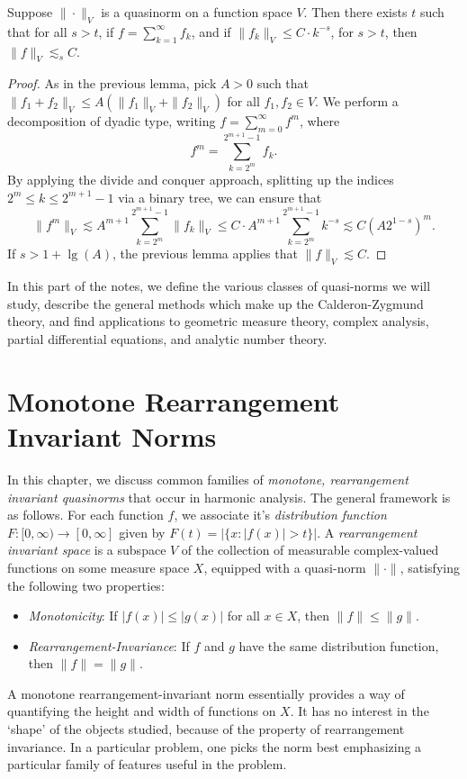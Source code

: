 \begin{lemma}
    Suppose $\| \cdot \|_V$ is a quasinorm on a function space $V$. Then there exists $t$ such that for all $s > t$, if $f = \sum_{k = 1}^\infty f_k$, and if $\| f_k \|_V \leq C \cdot k^{-s}$, for $s > t$, then $\| f \|_V \lesssim_s C$.
\end{lemma}
\begin{proof}
    As in the previous lemma, pick $A > 0$ such that $\| f_1 + f_2 \|_V \leq A (\| f_1 \|_V + \| f_2 \|_V)$ for all $f_1,f_2 \in V$. We perform a decomposition of dyadic type, writing $f = \sum_{m = 0}^\infty f^m$, where
    \[ f^m = \sum_{k = 2^m}^{2^{m+1} - 1} f_k. \]
    By applying the divide and conquer approach, splitting up the indices $2^m \leq k \leq 2^{m+1} - 1$ via a binary tree, we can ensure that
    \[ \| f^m \|_V \lesssim A^{m+1} \sum_{k = 2^m}^{2^{m+1} - 1} \| f_k \|_V \leq C \cdot A^{m+1} \sum_{k = 2^m}^{2^{m+1} - 1} k^{-s} \lesssim C (A 2^{1-s})^m. \]
    If $s > 1 + \lg(A)$, the previous lemma applies that $\| f \|_V \lesssim C$.
\end{proof}

In this part of the notes, we define the various classes of quasi-norms we will study, describe the general methods which make up the Calderon-Zygmund theory, and find applications to geometric measure theory, complex analysis, partial differential equations, and analytic number theory.





\chapter{Monotone Rearrangement Invariant Norms}

In this chapter, we discuss common families of \emph{monotone, rearrangement invariant quasinorms} that occur in harmonic analysis. The general framework is as follows. For each function $f$, we associate it's \emph{distribution function} $F: [0,\infty) \to [0,\infty]$ given by $F(t) = |\{ x : |f(x)| > t \}|$. A \emph{rearrangement invariant space} is a subspace $V$ of the collection of measurable complex-valued functions on some measure space $X$, equipped with a quasi-norm $\| \cdot \|$, satisfying the following two properties:
%
\begin{itemize}
    \item \emph{Monotonicity}: If $|f(x)| \leq |g(x)|$ for all $x \in X$, then $\| f \| \leq \| g \|$.

    \item \emph{Rearrangement-Invariance}: If $f$ and $g$ have the same distribution function, then $\| f \| = \| g \|$.
\end{itemize}
%
A monotone rearrangement-invariant norm essentially provides a way of quantifying the height and width of functions on $X$. It has no interest in the `shape' of the objects studied, because of the property of rearrangement invariance. In a particular problem, one picks the norm best emphasizing a particular family of features useful in the problem.

